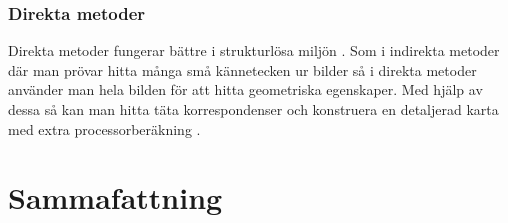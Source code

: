 \subsection{Direkta metoder}

Direkta metoder fungerar bättre i strukturlösa miljön \citep{Engel2014LSDSLAMLD}. Som i indirekta metoder där man prövar hitta många små kännetecken ur bilder så i direkta metoder använder man hela bilden för att hitta geometriska egenskaper. Med hjälp av dessa så kan man hitta täta korrespondenser och konstruera en detaljerad karta med extra processorberäkning \citep{geospatial}. 

\chapter{Sammafattning}

\iffalse
Mäst är inomhus av drönaren
Problem med beräkning, pga batterikapacitet och komplexa algoritmer och bildbearbetningsalgoritmer
6DoF globalsubmaps
\fi


